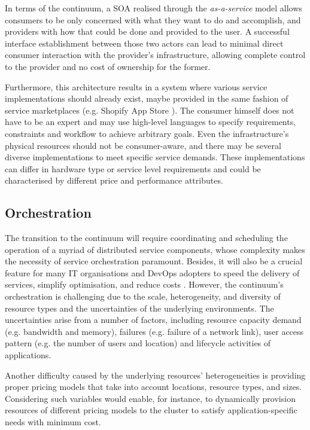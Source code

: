 In terms of the continuum, a SOA realised through the \emph{as-a-service} model allows consumers to be only concerned with what they want to do and accomplish, and providers with how that could be done and provided to the user. A successful interface establishment between those two actors can lead to minimal direct consumer interaction with the provider's infrastructure, allowing complete control to the provider and no cost of ownership for the former.

Furthermore, this architecture results in a system where various service implementations should already exist, maybe provided in the same fashion of service marketplaces (e.g. Shopify App Store \cite{shopify}). The consumer himself does not have to be an expert and may use high-level languages to specify requirements, constraints and workflow to achieve arbitrary goals. Even the infrastructure's physical resources should not be consumer-aware, and there may be several diverse implementations to meet specific service demands. These implementations can differ in hardware type or service level requirements and could be characterised by different price and performance attributes.

\subsection{Orchestration}

The transition to the continuum will require coordinating and scheduling the operation of a myriad of distributed service components, whose complexity makes the necessity of service orchestration paramount. Besides, it will also be a crucial feature for many IT organisations and DevOps adopters to speed the delivery of services, simplify optimisation, and reduce costs \cite{akamai}. However, the continuum's orchestration is challenging due to the scale, heterogeneity, and diversity of resource types and the uncertainties of the underlying environments. The uncertainties arise from a number of factors, including resource capacity demand (e.g. bandwidth and memory), failures (e.g. failure of a network link), user access pattern (e.g. the number of users and location) and lifecycle activities of applications.

Another difficulty caused by the underlying resources' heterogeneities is providing proper pricing models that take into account locations, resource types, and sizes. Considering such variables would enable, for instance, to dynamically provision resources of different pricing models to the cluster to satisfy application-specific needs with minimum cost.

